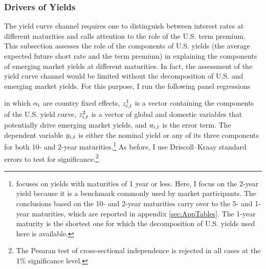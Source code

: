 {\subsubsection{Drivers of Yields}
The yield curve channel requires one to distinguish between interest rates at different maturities and calls attention to the role of the U.S. term premium. 
This subsection assesses the role of the components of U.S. yields (the average expected future short rate and the term premium) in explaining the components of emerging market yields at different maturities. 
In fact, the assessment of the yield curve channel would be limited without the decomposition of U.S. and emerging market yields. 
For this purpose, I run the following panel regressions 

\noindent in which \(\alpha_{i}\) are country fixed effects, \(z^{1}_{i,t}\) is a vector containing the components of the U.S. yield curve, \(z^{2}_{i,t}\) is a vector of global and domestic variables that potentially drive emerging market yields, and \(u_{i,t}\) is the error term. 
The dependent variable \(y_{i,t}\) is either the nominal yield or any of its three components for both 10- and 2-year maturities.\footnote{ \cite{Kalemli-Ozcan:2019} focuses on yields with maturities of 1 year or less. Here, I focus on the 2-year yield because it is a benchmark commonly used by market participants. The conclusions based on the 10- and 2-year maturities carry over to the 5- and 1-year maturities, which are reported in appendix \ref{sec:AppTables}. The 1-year maturity is the shortest one for which the decomposition of U.S. yields used here is available.} 
As before, I use Driscoll--Kraay standard errors to test for significance.\footnote{ The Pesaran test of cross-sectional independence is rejected in all cases at the 1\% significance level.} 

}
